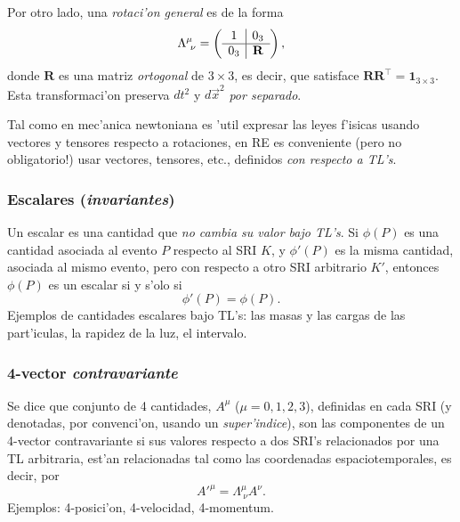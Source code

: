 Por otro lado, una \textit{rotaci'on general} es de la forma
\begin{equation}
\Lambda^\mu_{\ \nu}=\left(
\begin{array}[c]{c|c}
1 & 0_3 \\
\hline
0_3 & \mathbf{R}
\end{array}
\right), \label{rotgen}
\end{equation}
donde $\mathbf{R}$ es una matriz \textit{ortogonal} de $3\times 3$, es decir, que satisface $\mathbf{R}\mathbf{R}^\top=\mathbf{1}_{3\times 3}$. Esta transformaci'on preserva $dt^2$ y $d\vec{x}^2$ \textit{por separado}.

Tal como en mec'anica newtoniana es 'util expresar las leyes f'isicas usando
vectores y tensores respecto a rotaciones, en RE es conveniente (pero no
obligatorio!) usar vectores, tensores, etc., definidos \textit{con respecto  a TL's}.

\subsubsection{Escalares (\textit{invariantes})}
Un escalar es una cantidad que \textit{no cambia su valor bajo TL's}. Si $\phi(P)$ es una cantidad asociada al evento $P$ respecto al SRI $K$, y $\phi'(P)$ es la misma cantidad, asociada al mismo evento, pero con respecto a otro SRI arbitrario $K'$, entonces $\phi(P)$ es un escalar si y s'olo si
\begin{equation}
\phi'(P)=\phi(P).
\end{equation}
Ejemplos de cantidades escalares bajo TL's: las masas y las cargas de
las part'iculas, la rapidez de la luz, el intervalo.

\subsubsection{4-vector \textit{contravariante}}
Se dice que conjunto de 4 cantidades, $A^\mu$ ($\mu=0,1,2,3$), definidas en cada SRI (y denotadas, por convenci'on, usando un \textit{super'indice}), son las componentes de un 4-vector contravariante si sus valores respecto a dos SRI's relacionados por una TL arbitraria, est'an relacionadas tal como las coordenadas espaciotemporales, es decir, por
\begin{equation}
A'^\mu=\Lambda^\mu_{\ \nu} A^\nu .
\end{equation}
Ejemplos: 4-posici'on, 4-velocidad, 4-momentum.

